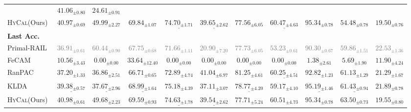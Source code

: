 \begin{table}[t]
{\begin{tabular}{l c c c c c c c c c c}
  & $41.06_{\pm 0.80}$ & $24.61_{\pm 0.91}$ \\
\quad \textsc{HyCal}(Ours)
  & $\mathbf{40.97_{\pm 0.69}}$ & $\mathbf{49.99_{\pm 2.27}}$ & $\mathbf{69.84_{\pm 1.07}}$
  & $\underline{74.70_{\pm 1.71}}$ & $\underline{39.65_{\pm 2.62}}$ & $77.56_{\pm 6.05}$
  & $\underline{60.47_{\pm 4.63}}$ & $\mathbf{95.34_{\pm 0.78}}$
  & $\mathbf{54.48_{\pm 0.78}}$ & $19.50_{\pm 0.76}$ \\\midrule\hline
\multicolumn{11}{l}{\textbf{Last Acc.}}\\
\quad Primal-RAIL~\cite{xu2024advancing}
  & \textcolor{gray}{$36.91_{\pm 0.61}$ }& \textcolor{gray}{$60.44_{\pm 0.90}$} & \textcolor{gray}{$67.75_{\pm 0.68}$ }& \textcolor{gray}{$71.66_{\pm 1.11}$}
  & \textcolor{gray}{$20.90_{\pm 7.20}$} & \textcolor{gray}{$77.73_{\pm 6.05}$ }& \textcolor{gray}{$53.23_{\pm 0.61}$} & \textcolor{gray}{$90.30_{\pm 0.67}$}
  & \textcolor{gray}{$59.86_{\pm 1.51}$ }& \textcolor{gray}{$22.53_{\pm 1.36}$ }\\\hdashline
\quad FeCAM~\cite{goswami2023fecam}
  & $10.56_{\pm 3.43}$ & $0.00_{\pm 0.00}$ & $33.64_{\pm 12.40}$ & $0.00_{\pm 0.00}$
  & $0.00_{\pm 0.00}$  & $0.00_{\pm 0.00}$ & $0.00_{\pm 0.00}$   & $1.38_{\pm 2.61}$
  & $5.69_{\pm 1.90}$  & $11.90_{\pm 4.24}$ \\
\quad RanPAC~\cite{mcdonnell2023ranpac}
  & $37.20_{\pm 1.33}$ & $36.86_{\pm 2.51}$ & $66.71_{\pm 0.65}$ & $72.89_{\pm 4.74}$
  & $\mathbf{41.04_{\pm 6.97}}$ & $\mathbf{81.25_{\pm 4.61}}$
  & $\underline{60.25_{\pm 4.51}}$ & $92.82_{\pm 1.23}$
  & $61.13_{\pm 1.29}$ & $21.29_{\pm 1.67}$ \\
\quad KLDA~\cite{momeni2025continual}
  & $\underline{39.38_{\pm 0.57}}$ & $\underline{37.67_{\pm 2.96}}$ & $\underline{68.99_{\pm 1.64}}$
  & $\mathbf{75.18_{\pm 4.39}}$ & $37.11_{\pm 3.07}$ & $\underline{78.77_{\pm 4.20}}$
  & $59.17_{\pm 4.10}$ & $\underline{95.19_{\pm 1.46}}$
  & $\underline{61.43_{\pm 0.94}}$ & $21.89_{\pm 0.78}$ \\
\quad \textsc{HyCal}(Ours)
  & $\mathbf{40.98_{\pm 0.61}}$ & $\mathbf{49.68_{\pm 2.23}}$ & $\mathbf{69.59_{\pm 0.93}}$
  & $\underline{74.63_{\pm 1.78}}$ & $\underline{39.54_{\pm 2.62}}$ & $77.71_{\pm 5.24}$
  & $\mathbf{60.51_{\pm 4.73}}$ & $\mathbf{95.34_{\pm 0.78}}$
  & $\mathbf{63.50_{\pm 0.73}}$ & $19.55_{\pm 0.80}$ \\
\bottomrule
\end{tabular}
}%
\end{table}
